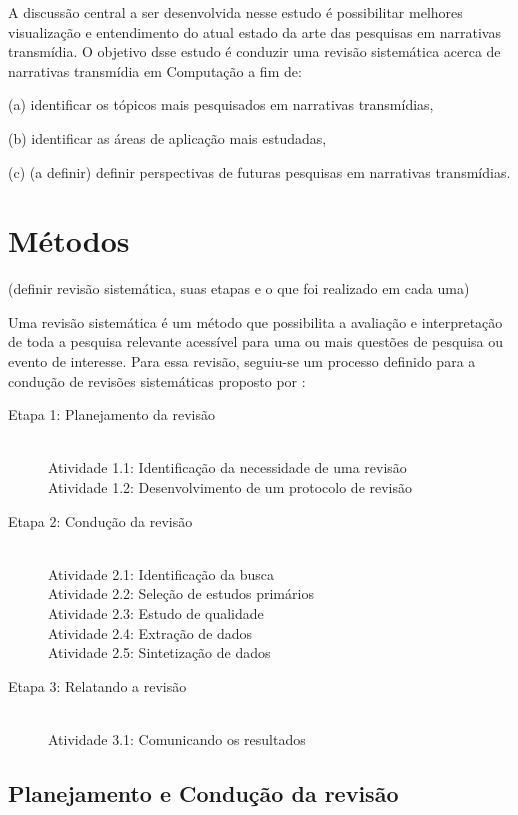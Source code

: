 \documentclass[
article,			%
11pt,				%
oneside,			%
a4paper,			%
english,			%
brazil,				%
sumario=tradicional
]{abntex2}
\begin{document}
  A discussão central a ser desenvolvida nesse estudo é possibilitar melhores visualização e entendimento do atual estado da arte das pesquisas em narrativas transmídia.  O objetivo dsse estudo é conduzir uma revisão sistemática acerca de narrativas transmídia em Computação a fim de:

  (a) identificar os tópicos mais pesquisados em narrativas transmídias,

  (b) identificar as áreas de aplicação mais estudadas,

  (c) \textsf{(a definir)} definir perspectivas de futuras pesquisas em narrativas transmídias.

  \section{Métodos}

  \textsf{(definir revisão sistemática, suas etapas e o que foi realizado em cada uma)}

  Uma revisão sistemática é um método que possibilita a avaliação e interpretação de toda a pesquisa relevante acessível para uma ou mais questões de pesquisa ou evento de interesse. Para essa revisão, seguiu-se um processo definido para a condução de revisões sistemáticas proposto por :

  \begin{description}
    \item[Etapa 1: Planejamento da revisão] \hfill \\
    Atividade 1.1: Identificação da necessidade de uma revisão \\
    Atividade 1.2: Desenvolvimento de um protocolo de revisão
    \item[Etapa 2: Condução da revisão] \hfill \\
    Atividade 2.1: Identificação da busca \\
    Atividade 2.2: Seleção de estudos primários \\
    Atividade 2.3: Estudo de qualidade \\
    Atividade 2.4: Extração de dados \\
    Atividade 2.5: Sintetização de dados
    \item[Etapa 3: Relatando a revisão] \hfill \\
    Atividade 3.1: Comunicando os resultados
  \end{description}

  \subsection{Planejamento e Condução da revisão}
\end{document}

